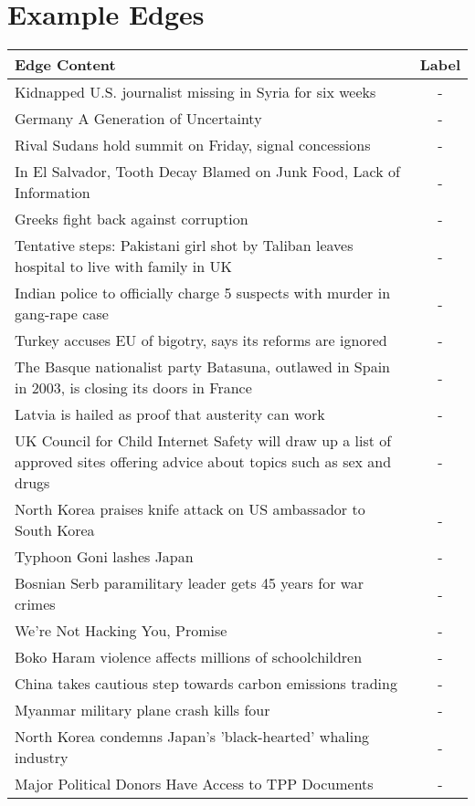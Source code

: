\section{Example Edges}
\label{app-sec:example-edges}

\begin{table}[H]
\begin{tabular}{p{12.5cm} c}
\toprule
Edge Content & Label \\
\midrule
Kidnapped U.S. journalist missing in Syria for six weeks & - \\
Germany A Generation of Uncertainty & - \\
Rival Sudans hold summit on Friday, signal concessions & - \\
In El Salvador, Tooth Decay Blamed on Junk Food, Lack of Information & - \\
Greeks fight back against corruption & - \\
Tentative steps: Pakistani girl shot by Taliban leaves hospital to live with family in UK & - \\
Indian police to officially charge 5 suspects with murder in gang-rape case & - \\
Turkey accuses EU of bigotry, says its reforms are ignored & - \\
The Basque nationalist party Batasuna, outlawed in Spain in 2003, is closing its doors in France & - \\
Latvia is hailed as proof that austerity can work & - \\
\midrule
UK Council for Child Internet Safety will draw up a list of approved sites offering advice about topics such as sex and drugs & - \\
North Korea praises knife attack on US ambassador to South Korea & - \\
Typhoon Goni lashes Japan & - \\
Bosnian Serb paramilitary leader gets 45 years for war crimes & - \\
We're Not Hacking You, Promise & - \\
Boko Haram violence affects millions of schoolchildren & - \\
China takes cautious step towards carbon emissions trading & - \\
Myanmar military plane crash kills four & - \\
North Korea condemns Japan's 'black-hearted' whaling industry & - \\
Major Political Donors Have Access to TPP Documents & - \\

\end{tabular}
\end{table}
